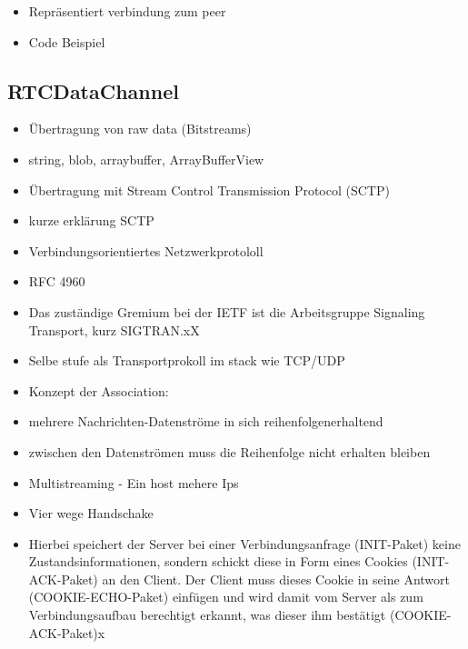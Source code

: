 \begin{itemize}
	\item Repräsentiert verbindung zum peer
	\item Code Beispiel
\end{itemize}

\subsection{RTCDataChannel}

\begin{itemize}
	\item Übertragung von raw data (Bitstreams)
	\item string, blob, arraybuffer, ArrayBufferView
	\item Übertragung mit Stream Control Transmission Protocol (SCTP)
	\item kurze erklärung SCTP
	\item 	Verbindungsorientiertes Netzwerkprotololl
	\item 	 RFC 4960
	\item 	Das zuständige Gremium bei der IETF ist die Arbeitsgruppe Signaling Transport, kurz SIGTRAN.xX
	\item 	Selbe stufe als Transportprokoll im stack wie TCP/UDP
	\item 	Konzept der Association: 
	\item 		mehrere Nachrichten-Datenströme in sich reihenfolgenerhaltend
	\item 		zwischen den Datenströmen muss die Reihenfolge nicht erhalten bleiben
	\item 	Multistreaming - Ein host mehere Ips
	\item 	Vier wege Handschake
	\item 		Hierbei speichert der Server bei einer Verbindungsanfrage (INIT-Paket) keine Zustandsinformationen, sondern schickt diese in Form eines Cookies (INIT-ACK-Paket) an den Client. Der Client muss dieses Cookie in seine Antwort (COOKIE-ECHO-Paket) einfügen und wird damit vom Server als zum Verbindungsaufbau berechtigt erkannt, was dieser ihm bestätigt (COOKIE-ACK-Paket)x
\end{itemize}


